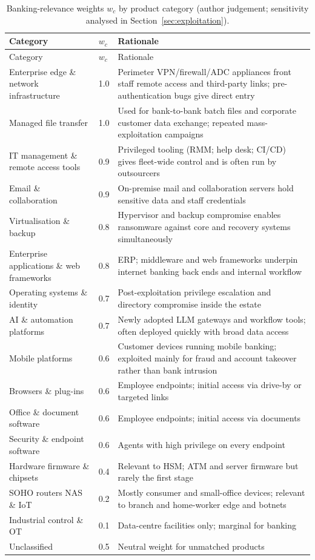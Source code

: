 \begin{longtable}{p{}p{}p{}}
\caption{Banking-relevance weights $w_c$ by product category (author judgement; sensitivity analysed in Section~\ref{sec:exploitation}).}\label{tab:weights}\\
\toprule
Category & $w_c$ & Rationale \\
\midrule
\endfirsthead
\toprule
Category & $w_c$ & Rationale \\
\midrule
\endhead
\bottomrule
\endfoot
Enterprise edge \& network infrastructure & 1.0 & Perimeter VPN/firewall/ADC appliances front staff remote access and third-party links; pre-authentication bugs give direct entry \\
Managed file transfer & 1.0 & Used for bank-to-bank batch files and corporate customer data exchange; repeated mass-exploitation campaigns \\
IT management \& remote access tools & 0.9 & Privileged tooling (RMM; help desk; CI/CD) gives fleet-wide control and is often run by outsourcers \\
Email \& collaboration & 0.9 & On-premise mail and collaboration servers hold sensitive data and staff credentials \\
Virtualisation \& backup & 0.8 & Hypervisor and backup compromise enables ransomware against core and recovery systems simultaneously \\
Enterprise applications \& web frameworks & 0.8 & ERP; middleware and web frameworks underpin internet banking back ends and internal workflow \\
Operating systems \& identity & 0.7 & Post-exploitation privilege escalation and directory compromise inside the estate \\
AI \& automation platforms & 0.7 & Newly adopted LLM gateways and workflow tools; often deployed quickly with broad data access \\
Mobile platforms & 0.6 & Customer devices running mobile banking; exploited mainly for fraud and account takeover rather than bank intrusion \\
Browsers \& plug-ins & 0.6 & Employee endpoints; initial access via drive-by or targeted links \\
Office \& document software & 0.6 & Employee endpoints; initial access via documents \\
Security \& endpoint software & 0.6 & Agents with high privilege on every endpoint \\
Hardware firmware \& chipsets & 0.4 & Relevant to HSM; ATM and server firmware but rarely the first stage \\
SOHO routers NAS \& IoT & 0.2 & Mostly consumer and small-office devices; relevant to branch and home-worker edge and botnets \\
Industrial control \& OT & 0.1 & Data-centre facilities only; marginal for banking \\
Unclassified & 0.5 & Neutral weight for unmatched products \\
\end{longtable}